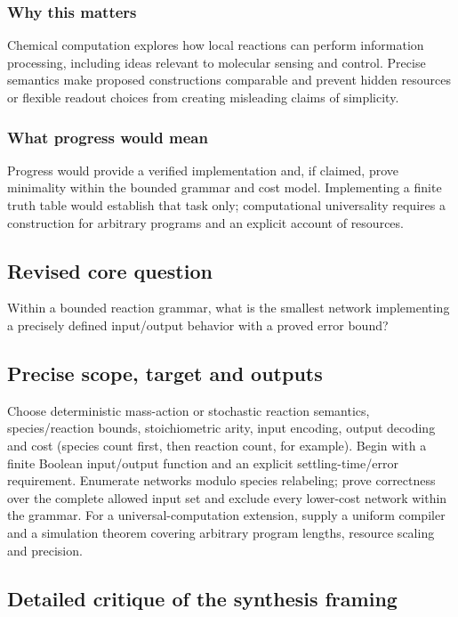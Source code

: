 \documentclass[
  11pt,
]{article}
\begin{document}
\subsubsection{Why this matters}

Chemical computation explores how local reactions can perform
information processing, including ideas relevant to molecular sensing
and control. Precise semantics make proposed constructions comparable
and prevent hidden resources or flexible readout choices from creating
misleading claims of simplicity.

\subsubsection{What progress would mean}

Progress would provide a verified implementation and, if claimed, prove
minimality within the bounded grammar and cost model. Implementing a
finite truth table would establish that task only; computational
universality requires a construction for arbitrary programs and an
explicit account of resources.

\subsection{Revised core question}

Within a bounded reaction grammar, what is the smallest network
implementing a precisely defined input/output behavior with a proved
error bound?

\subsection{Precise scope, target and outputs}

Choose deterministic mass-action or stochastic reaction semantics,
species/reaction bounds, stoichiometric arity, input encoding, output
decoding and cost (species count first, then reaction count, for
example). Begin with a finite Boolean input/output function and an
explicit settling-time/error requirement. Enumerate networks modulo
species relabeling; prove correctness over the complete allowed input
set and exclude every lower-cost network within the grammar. For a
universal-computation extension, supply a uniform compiler and a
simulation theorem covering arbitrary program lengths, resource scaling
and precision.

\subsection{Detailed critique of the synthesis framing}
\end{document}
